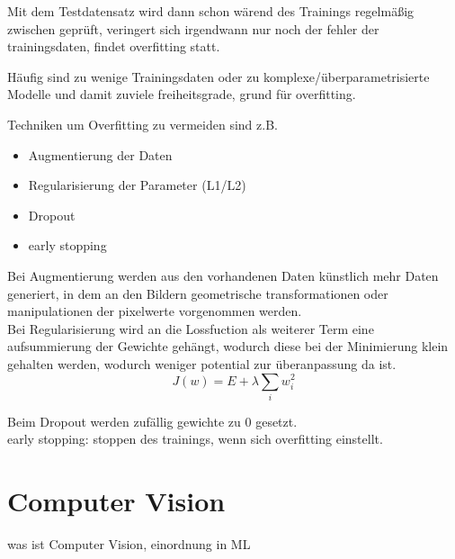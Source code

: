 Mit dem Testdatensatz wird dann schon wärend des Trainings regelmäßig zwischen geprüft, 
veringert sich irgendwann nur noch der fehler der trainingsdaten, findet overfitting statt.

%     

Häufig sind zu wenige Trainingsdaten oder zu komplexe/überparametrisierte
 Modelle und damit zuviele freiheitsgrade, grund für overfitting.



Techniken um Overfitting zu vermeiden sind z.B.
\begin{itemize}
    \item Augmentierung der Daten
    \item Regularisierung der Parameter (L1/L2)
    \item Dropout
    \item early stopping
\end{itemize}

Bei Augmentierung werden aus den vorhandenen Daten künstlich mehr 
Daten generiert, in dem an den Bildern geometrische transformationen 
oder manipulationen der pixelwerte vorgenommen werden.
\\
Bei Regularisierung wird an die Lossfuction als weiterer Term
 eine aufsummierung der Gewichte gehängt, wodurch diese bei der Minimierung 
  klein gehalten werden, wodurch weniger potential zur überanpassung da ist.
  \begin{equation}
    \label{eq:regularization}
    J(w) = E + \lambda \sum_{i} w_{i}^{2}
\end{equation}

Beim Dropout werden zufällig gewichte zu 0 gesetzt.
\\
early stopping: stoppen des trainings, wenn sich overfitting einstellt.



\section{Computer Vision}

was ist Computer Vision, einordnung in ML

